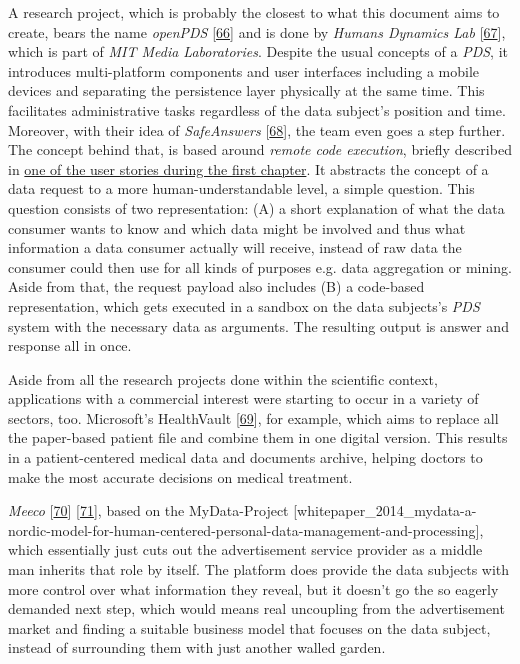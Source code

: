\documentclass[12pt,english,a4paper,titlepage,cleardoublepage=empty,dottedtoc]{report}
\begin{document}
A research project, which is probably the closest to what this document
aims to create, bears the name \emph{openPDS}
{[}\protect\hyperlink{ref-paper_2012_openpds_on-trusted-use-of-large-scale-personal-data}{66}{]}
and is done by \emph{Humans Dynamics Lab}
{[}\protect\hyperlink{ref-web_mit_openpds-safeanswers-project-page}{67}{]},
which is part of \emph{MIT Media Laboratories}. Despite the usual
concepts of a \emph{PDS}, it introduces multi-platform components and
user interfaces including a mobile devices and separating the
persistence layer physically at the same time. This facilitates
administrative tasks regardless of the data subject's position and time.
Moreover, with their idea of \emph{SafeAnswers}
{[}\protect\hyperlink{ref-paper_2014_openpds_protecting-privacy-of-meta-data-through-safeanswers}{68}{]},
the team even goes a step further. The concept behind that, is based
around \emph{remote code execution}, briefly described in
\protect\hyperlink{header-applying-for-a-loan-and-checking-creditworthiness}{one
of the user stories during the first chapter}. It abstracts the concept
of a data request to a more human-understandable level, a simple
question. This question consists of two representation: (A) a short
explanation of what the data consumer wants to know and which data might
be involved and thus what information a data consumer actually will
receive, instead of raw data the consumer could then use for all kinds
of purposes e.g. data aggregation or mining. Aside from that, the
request payload also includes (B) a code-based representation, which
gets executed in a sandbox on the data subjects's \emph{PDS} system with
the necessary data as arguments. The resulting output is answer and
response all in once.

Aside from all the research projects done within the scientific context,
applications with a commercial interest were starting to occur in a
variety of sectors, too. Microsoft's HealthVault
{[}\protect\hyperlink{ref-web_microsoft_healthvault}{69}{]}, for
example, which aims to replace all the paper-based patient file and
combine them in one digital version. This results in a patient-centered
medical data and documents archive, helping doctors to make the most
accurate decisions on medical treatment.

\emph{Meeco} {[}\protect\hyperlink{ref-web_meeco_how-it-works}{70}{]}
{[}\protect\hyperlink{ref-slides_2015_meeco-case-study}{71}{]}, based on
the MyData-Project
{[}whitepaper\_2014\_mydata-a-nordic-model-for-human-centered-personal-data-management-and-processing{]},
which essentially just cuts out the advertisement service provider as a
middle man inherits that role by itself. The platform does provide the
data subjects with more control over what information they reveal, but
it doesn't go the so eagerly demanded next step, which would means real
uncoupling from the advertisement market and finding a suitable business
model that focuses on the data subject, instead of surrounding them with
just another walled garden.
\end{document}
